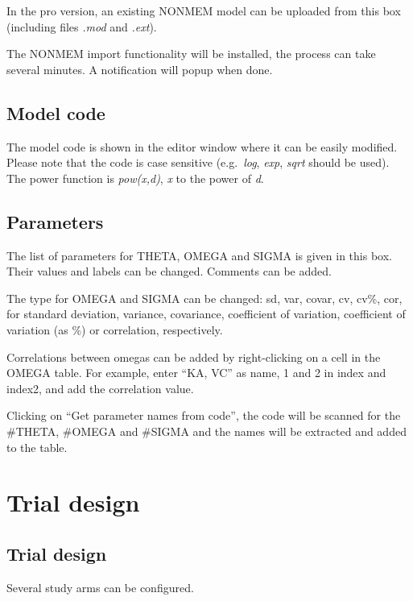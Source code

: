 \documentclass[
]{book}
\theoremstyle{definition}
\theoremstyle{definition}
\theoremstyle{definition}
\theoremstyle{definition}
\theoremstyle{remark}
\begin{document}
In the pro version, an existing NONMEM model can be uploaded from this box (including files \emph{.mod} and \emph{.ext}).

The NONMEM import functionality will be installed, the process can take several minutes. A notification will popup when done.

\hypertarget{model-code}{%
\section{Model code}\label{model-code}}

The model code is shown in the editor window where it can be easily modified. Please note that the code is case sensitive (e.g.~\emph{log}, \emph{exp}, \emph{sqrt} should be used). The power function is \emph{pow(x,d)}, \emph{x} to the power of \emph{d}.

\hypertarget{parameters}{%
\section{Parameters}\label{parameters}}

The list of parameters for THETA, OMEGA and SIGMA is given in this box. Their values and labels can be changed. Comments can be added.

The type for OMEGA and SIGMA can be changed: sd, var, covar, cv, cv\%, cor, for standard deviation, variance, covariance, coefficient of variation, coefficient of variation (as \%) or correlation, respectively.

Correlations between omegas can be added by right-clicking on a cell in the OMEGA table. For example, enter ``KA, VC'' as name, 1 and 2 in index and index2, and add the correlation value.

Clicking on ``Get parameter names from code'', the code will be scanned for the \#THETA, \#OMEGA and \#SIGMA and the names will be extracted and added to the table.

\hypertarget{trial-design}{%
\chapter{Trial design}\label{trial-design}}

\hypertarget{trial-design-1}{%
\section{Trial design}\label{trial-design-1}}

Several study arms can be configured.
\end{document}
